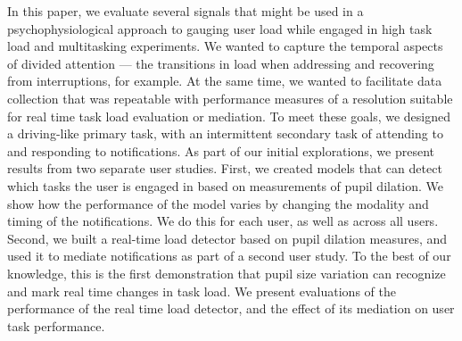 In this paper, we evaluate several signals that might be used in a psychophysiological approach to gauging user load while engaged in high task load and multitasking experiments. We wanted to capture the temporal aspects of divided attention --- the transitions in load when addressing and recovering from interruptions, for example. At the same time, we wanted to facilitate data collection that was repeatable with performance measures of a resolution suitable for real time task load evaluation or mediation. To meet these goals, we designed a driving-like primary task, with an intermittent secondary task of attending to and responding to notifications. As part of our initial explorations, we present results from two separate user studies. First, we created models that can detect which tasks the user is engaged in based on measurements of pupil dilation. We show how the performance of the model varies by changing the modality and timing of the notifications. We do this for each user, as well as across all users. Second, we built a real-time load detector based on pupil dilation measures, and used it to mediate notifications as part of a second user study. To the best of our knowledge, this is the first demonstration that pupil size variation can recognize and mark real time changes in task load. We present evaluations of the performance of the real time load detector, and the effect of its mediation on user task performance. 